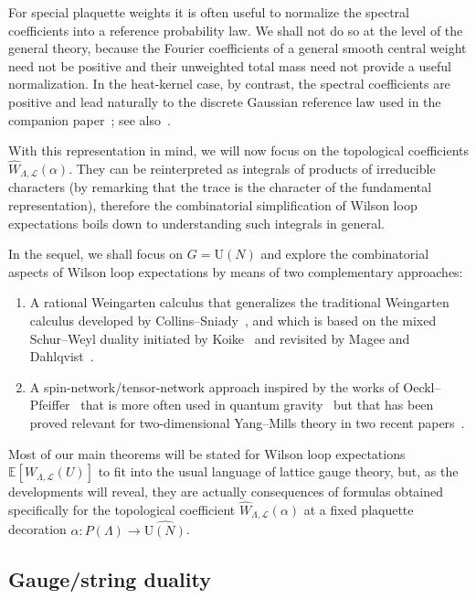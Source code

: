\documentclass[11pt,a4paper,reqno]{article}
\theoremstyle{definition}
\theoremstyle{remark}
\newcommand\U{{\mathrm U}}
\newcommand\E{\mathbb{E}}
\newcommand\Lc{{\mathcal{L}}}
\begin{document}
For special plaquette weights it is often useful to normalize the spectral coefficients into a reference probability law. We shall not do so at the level of the general theory, because the Fourier coefficients of a general smooth central weight need not be positive and their unweighted total mass need not provide a useful normalization. In the heat-kernel case, by contrast, the spectral coefficients are positive and lead naturally to the discrete Gaussian reference law used in the companion paper~\cite{Lem26prep}; see also~\cite{LemMai25,LM2,Lem25}.

With this representation in mind, we will now focus on the topological coefficients $\widehat{W}_{\Lambda,\Lc}(\alpha)$. They can be reinterpreted as integrals of products of irreducible characters (by remarking that the trace is the character of the fundamental representation), therefore the combinatorial simplification of Wilson loop expectations boils down to understanding such integrals in general.

In the sequel, we shall focus on $G=\U(N)$ and explore the combinatorial aspects of Wilson loop expectations by means of two complementary approaches:
\begin{enumerate}
\item A rational Weingarten calculus that generalizes the traditional Weingarten calculus developed by Collins--Sniady~\cite{ColSni06}, and which is based on the mixed Schur--Weyl duality initiated by Koike~\cite{Koi89} and revisited by Magee and Dahlqvist~\cite{Mag,Mag2,Dah26}.
\item A spin-network/tensor-network approach inspired by the works of Oeckl--Pfeiffer~\cite{OeckPfei01} that is more often used in quantum gravity~\cite{DMS16} but that has been proved relevant for two-dimensional Yang--Mills theory in two recent papers~\cite{Lev26,Dah26}.
\end{enumerate}

Most of our main theorems will be stated for Wilson loop expectations $\E[W_{\Lambda,\Lc}(U)]$ to fit into the usual language of lattice gauge theory, but, as the developments will reveal, they are actually consequences of formulas obtained specifically for the topological coefficient $\widehat{W}_{\Lambda,\Lc}(\alpha)$ at a fixed plaquette decoration $\alpha:P(\Lambda)\to\widehat{\U(N)}$.

\subsection{Gauge/string duality}
\end{document}
